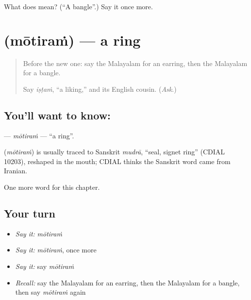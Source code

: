 \begin{tcolorbox}[breakable,colback=teal!4,colframe=teal!35!black,title={Before you move on}]
What does  mean? (\textquotedblleft{}A bangle\textquotedblright{}.) Say it once more.
\end{tcolorbox}
\section[\texorpdfstring{\ml{മോതിരം} (mōtiraṁ)}{മോതിരം (mōtiraṁ)}]{ (mōtiraṁ) — a ring}

\label{lesson:ML-C156-motiram}



\begin{quote}
Before the new one: say the Malayalam for an earring, then the Malayalam for a bangle.

Say \emph{iṣṭaṁ}, \textquotedblleft{}a liking,\textquotedblright{} and its English cousin. (\emph{Ask}.)
\end{quote}

\subsection*{You'll want to know: }
\textbf{} — \emph{mōtiraṁ} — \textquotedblleft{}a ring\textquotedblright{}.

\begin{cousinweb}
\textbf{} (\emph{mōtiraṁ}) is usually traced to Sanskrit \emph{mudrā}, \textquotedblleft{}seal, signet ring\textquotedblright{} (CDIAL 10203), reshaped in the mouth; CDIAL thinks the Sanskrit word came from Iranian.
\end{cousinweb}

\begin{grammarlens}[title={What you've built}]
One more word for this chapter.
\end{grammarlens}

\subsection*{Your turn}
\begin{itemize}
\raggedright
  \item \emph{Say it:} \emph{mōtiraṁ}
  \item \emph{Say it:} \emph{mōtiraṁ}, once more
  \item \emph{Say it:} say \emph{mōtiraṁ}
  \item \emph{Recall:} say the Malayalam for an earring, then the Malayalam for a bangle, then say \emph{mōtiraṁ} again
\end{itemize}

